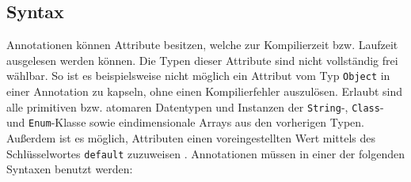 \subsection{Syntax}
\label{java_annotationen_syntax}
\noindent Annotationen können Attribute besitzen, welche zur Kompilierzeit bzw. Laufzeit ausgelesen werden können. Die Typen dieser Attribute sind nicht vollständig frei wählbar. So ist es beispielsweise nicht möglich ein Attribut vom Typ \texttt{Object} in einer Annotation zu kapseln, ohne einen Kompilierfehler auszulösen. Erlaubt sind alle primitiven bzw. atomaren Datentypen und Instanzen der \texttt{String}-, \texttt{Class}- und \texttt{Enum}-Klasse sowie eindimensionale Arrays aus den vorherigen Typen. Außerdem ist es möglich, Attributen einen voreingestellten Wert mittels des Schlüsselwortes \texttt{default} zuzuweisen \cite{Gosling2005}. Annotationen müssen in einer der folgenden Syntaxen benutzt werden:

